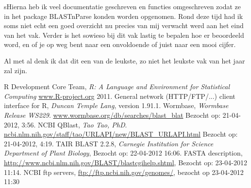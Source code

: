 \documentclass[a4paper]{article}
\begin{document}
sHierna heb ik veel documentatie geschreven en functies omgeschreven zodat ze in het package BLASTnParse konden worden opgenomen. Rond deze tijd had ik soms niet echt een goed overzicht nu precies van mij verwacht werd aan het eind van het vak. Verder is het sowieso bij dit vak lastig te bepalen hoe er beoordeeld word, en of je op weg bent naar een onvoldoende of juist naar een mooi cijfer. 

Al met al denk ik dat dit een van de leukste, zo niet het leukste vak van het jaar zal zijn.

\renewcommand{\refname}{Referenties}
\begin{thebibliography}{9}
    R Development Core Team, \emph{R: A Language and Environment for Statistical Computing}
    \url{www.R-project.org} 2011.
    General network (HTTP/FTP/...) client interface for R, \emph{Duncan Temple Lang}, version 1.91.1.
    Wormbase, \emph{Wormbase Release WS229}. \url{www.wormbase.org/db/searches/blast_blat} Bezocht op: 21-04-2012, 3:56.
    NCBI QBlast, \emph{Tao Tao, PhD}. \url{ncbi.nlm.nih.gov/staff/tao/URLAPI/new/BLAST_URLAPI.html} Bezocht op: 21-04-2012, 4:19.
    TAIR BLAST 2.2.8, \emph{Carnegie Institution for Science Department of Plant Biology}, Bezocht op: 22-04-2012 16:06.
    FASTA description, \url{http://www.ncbi.nlm.nih.gov/BLAST/blastcgihelp.shtml}, Bezocht op: 23-04-2012 11:14.
    NCBI ftp servers, \url{ftp://ftp.ncbi.nih.gov/genomes/}, bezocht op 23-04-2012 11:30
\end{thebibliography}
\end{document}
